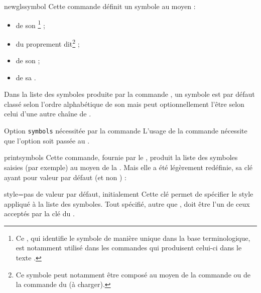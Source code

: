 \begin{docCommand}{newglssymbol}{}
  Cette commande définit un symbole au moyen :
  \begin{itemize}
  \item de son \footnote{Ce , qui identifie le symbole de
      manière unique dans la base terminologique, est notamment utilisé dans
      les commandes qui produisent celui-ci dans le texte .} ;
\item du  proprement dit\footnote{Ce symbole peut notamment être
    composé au moyen de la commande  ou de la commande 
    du  (à charger).} ;
  \item de son  ;
  \item de sa .
  \end{itemize}
  Dans la liste des symboles produite par la commande , un
  symbole est par défaut classé selon l'ordre alphabétique de son 
  mais peut optionnellement l'être selon celui d'une autre chaîne de
  .
\end{docCommand}

\begin{dbwarning}{Option \texttt{symbols} nécessitée par la commande
    \protect{}}{}
  L'usage de la commande  nécessite que l'option
   soit passée au .
\end{dbwarning}

\begin{docCommand}{printsymbols}{}
  Cette commande, fournie par le , produit la liste des
  symboles saisies (par exemple) au moyen de la . Mais
  elle a été légèrement redéfinie, sa clé  ayant pour valeur par
  défaut  (et non ) :
  \begin{docKey}{style}{=\textbar{}}{pas de valeur
      par défaut, initialement }
    Cette clé permet de spécifier le style appliqué à la liste des
    symboles. Tout  spécifié, autre que ,
    doit être l'un de ceux acceptés par la clé  du
    .
  \end{docKey}
\end{docCommand}

